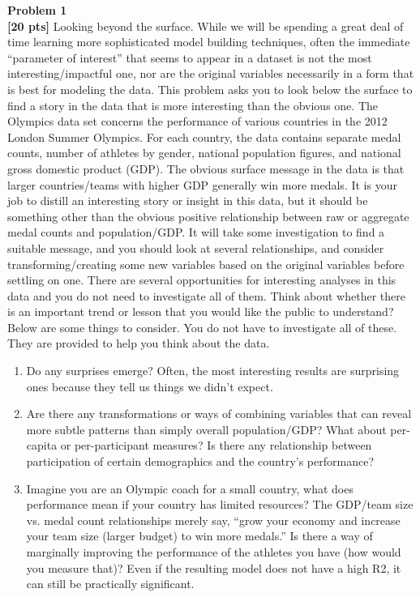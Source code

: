 \documentclass{article}
\newenvironment{problem}[2][Problem]
    { \begin{mdframed}[backgroundcolor=gray!20] \textbf{#1 #2} \\}
    {  \end{mdframed}}
\begin{document}
\begin{problem}{1}
\textbf{[20 pts]}
Looking beyond the surface. While we will be spending a great deal of time learning more sophisticated model building techniques, often the immediate “parameter of interest” that seems to appear in a dataset is not the most interesting/impactful one, nor are the original variables necessarily in a form that is best for modeling the data. This problem asks you to look below the surface to find a story in the data that is more interesting than the obvious one.
\newline
The Olympics data set concerns the performance of various countries in the 2012 London Summer Olympics. For each country, the data contains separate medal counts, number of athletes by gender, national population figures, and national gross domestic product (GDP). The obvious surface message in the data is that larger countries/teams with higher GDP generally win more medals. It is your job to distill an interesting story or insight in this data, but it should be something other than the obvious positive relationship between raw or aggregate medal counts and population/GDP.
\newline
It will take some investigation to find a suitable message, and you should look at several relationships, and consider transforming/creating some new variables based on the original variables before settling on one. There are several opportunities for interesting analyses in this data and you do not need to investigate all of them. Think about whether there is an important trend or lesson that you would like the public to understand? Below are some things to consider. You do not have to investigate all of these. They are provided to help you think about the data.
\begin{enumerate}
	\item Do any surprises emerge? Often, the most interesting results are surprising ones because they tell us things we didn’t expect.
	\item Are there any transformations or ways of combining variables that can reveal more subtle patterns than simply overall population/GDP? What about per-capita or per-participant measures? Is there any relationship between participation of certain demographics and the country’s performance?
	\item Imagine you are an Olympic coach for a small country, what does performance mean if your country has limited resources? The GDP/team size vs. medal count relationships merely say, “grow your economy and increase your team size (larger budget) to win more medals.” Is there a way of marginally improving the performance of the athletes you have (how would you measure that)? Even if the resulting model does not have a high R2, it can still be practically significant.

\end{enumerate}
\end{problem}
\end{document}
